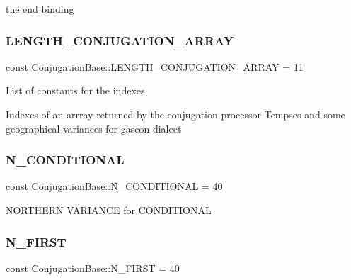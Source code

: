 the end binding \hypertarget{classConjugationBase_aa6a9ad231bf385e0bd9e240213facf36}{}\label{classConjugationBase_aa6a9ad231bf385e0bd9e240213facf36} 
\subsubsection{\texorpdfstring{L\+E\+N\+G\+T\+H\+\_\+\+C\+O\+N\+J\+U\+G\+A\+T\+I\+O\+N\+\_\+\+A\+R\+R\+AY}{LENGTH\_CONJUGATION\_ARRAY}}
{\footnotesize\ttfamily const Conjugation\+Base\+::\+L\+E\+N\+G\+T\+H\+\_\+\+C\+O\+N\+J\+U\+G\+A\+T\+I\+O\+N\+\_\+\+A\+R\+R\+AY = 11}



List of constants for the indexes. 

Indexes of an arrray returned by the conjugation processor Tempses and some geographical variances for gascon dialect \hypertarget{classConjugationBase_a66898e8176a1e2c5aacad8657b90df08}{}\label{classConjugationBase_a66898e8176a1e2c5aacad8657b90df08} 
\subsubsection{\texorpdfstring{N\+\_\+\+C\+O\+N\+D\+I\+T\+I\+O\+N\+AL}{N\_CONDITIONAL}}
{\footnotesize\ttfamily const Conjugation\+Base\+::\+N\+\_\+\+C\+O\+N\+D\+I\+T\+I\+O\+N\+AL = 40}

N\+O\+R\+T\+H\+E\+RN V\+A\+R\+I\+A\+N\+CE for C\+O\+N\+D\+I\+T\+I\+O\+N\+AL \hypertarget{classConjugationBase_a109b61ea3f44b885131acc8cd2cc1041}{}\label{classConjugationBase_a109b61ea3f44b885131acc8cd2cc1041} 
\subsubsection{\texorpdfstring{N\+\_\+\+F\+I\+R\+ST}{N\_FIRST}}
{\footnotesize\ttfamily const Conjugation\+Base\+::\+N\+\_\+\+F\+I\+R\+ST = 40}


